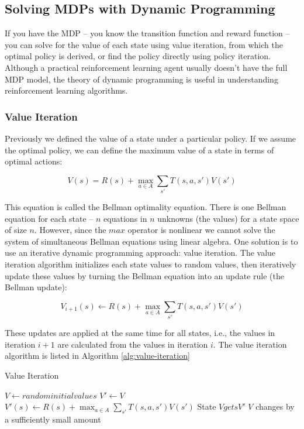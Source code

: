 \subsection{Solving MDPs with Dynamic Programming}

If you have the MDP -- you know the transition function and reward function -- you can solve for the value of each state using value iteration, from which the optimal policy is derived, or find the policy directly using policy iteration. Although a practical reinforcement learning agent usually doesn't have the full MDP model, the theory of dynamic programming is useful in understanding reinforcement learning algorithms.

\subsubsection{Value Iteration}

Previously we defined the value of a state under a particular policy. If we assume the optimal policy, we can define the maximum value of a state in terms of optimal actions:

\begin{equation}
V(s) = R(s) + \max_{a \in A} \sum_{s'} T(s, a, s') V(s')
\end{equation}

This equation is called the Bellman optimality equation. There is one Bellman equation for each state -- $n$ equations in $n$ unknowns (the values) for a state space of size $n$. However, since the $max$ operator is nonlinear we cannot solve the system of simultaneous Bellman equations using linear algebra. One solution is to use an iterative dynamic programming approach: value iteration. The value iteration algorithm initializes each state values to random values, then iteratively update these values by turning the Bellman equation into an update rule (the Bellman update):

\begin{equation}
V_{i+1}(s) \leftarrow R(s) + \max_{a \in A} \sum_{s'} T(s, a, s') V(s')
\end{equation}

These updates are applied at the same time for all states, i.e., the values in iteration $i+1$ are calculated from the values in iteration $i$. The value iteration algorithm is listed in Algorithm \ref{alg:value-iteration}


\begin{algorithm}
  \caption{Value Iteration}\label{alg:value-iteration}
  \begin{algorithmic}
    \State $V \gets random initial values$ 
    \Repeat
      \State $V' \gets V$
        \State $V'(s) \gets R(s) + \max_{a \in A} \sum_{s'} T(s, a, s') V(s')$
      \EndFor
      State $V gets V'$
    \Until $V$ changes by a sufficiently small amount
  \end{algorithmic}
\end{algorithm}


